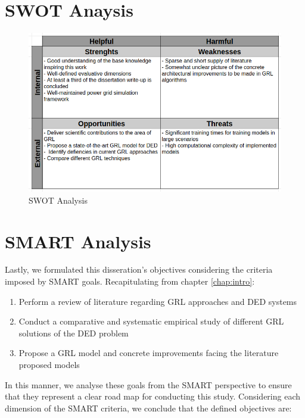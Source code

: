 \section{SWOT Anaysis}

\begin{figure}[H]
	\centering
	\includegraphics[width=0.90\linewidth]{./figures/swot.png}
	\caption{SWOT Analysis}
	\label{fig:swot}
\end{figure}

\section{SMART Analysis}

Lastly, we formulated this disseration's objectives considering the criteria imposed by SMART goals. Recapitulating from chapter \ref{chap:intro}:
\begin{enumerate}
	\item Perform a review of literature regarding \ac{GRL} approaches and \ac{DED} systems
	\item Conduct a comparative and systematic empirical study of different \ac{GRL} solutions of the \ac{DED} problem
	\item Propose a \ac{GRL} model and concrete improvements facing the literature proposed models
\end{enumerate}

In this manner, we analyse these goals from the SMART perspective to ensure that they represent a clear road map for conducting this study. Considering each dimension of the SMART criteria, we conclude that the defined objectives are:

